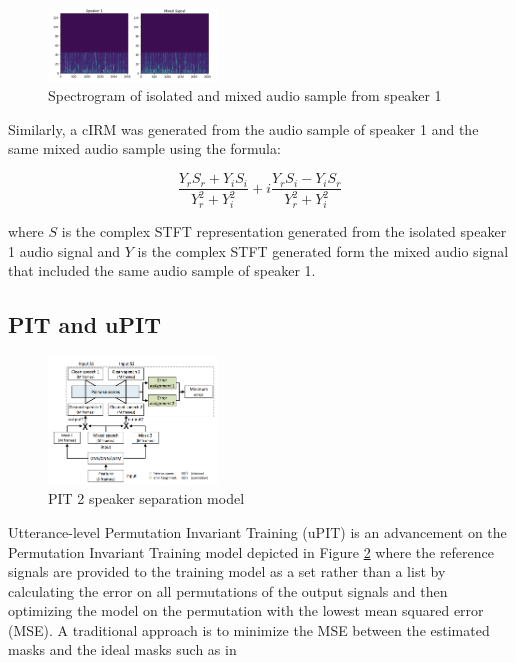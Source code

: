 \documentclass[journal, a4paper]{IEEEtran}
\begin{document}
\begin{figure}[h!]
    \centering  
     \caption{\label{fig:spec_speaker_1}Spectrogram of isolated and mixed audio sample from speaker 1}  
    \includegraphics[width=0.4\textwidth]{cIRM_same.png}  
\end{figure}

Similarly, a cIRM was generated from the audio sample of speaker 1 and the same mixed audio sample using the formula:

\begin{equation}
\dfrac{Y_r S_r + Y_i S_i}{Y_r^2 + Y_i^2} +
i\dfrac{Y_r S_i - Y_i S_r}{Y_r^2 + Y_i^2}
\end{equation}

\begin{flushleft}
where $S$ is the complex STFT representation generated from the isolated speaker 1 audio signal and $Y$ is the complex STFT generated form the mixed audio signal that included the same audio sample of speaker 1.\cite{DBLP:journals/corr/abs-1708-07524}
\end{flushleft}

\subsection{PIT and uPIT}

\begin{figure}[h]
    \centering  
     \caption{\label{fig:pit_diagram}PIT 2 speaker separation model}  
    \includegraphics[width=0.4\textwidth]{PIT.png}  
\end{figure}

Utterance-level Permutation Invariant Training (uPIT) is an advancement on the Permutation Invariant Training model depicted in Figure \ref{fig:pit_diagram} where the reference signals are provided to the training model as a set rather than a list by calculating the error on all permutations of the output signals and then optimizing the model on the permutation with the lowest mean squared error (MSE). A traditional approach is to minimize the MSE between the estimated masks and the ideal masks such as in
\end{document}
